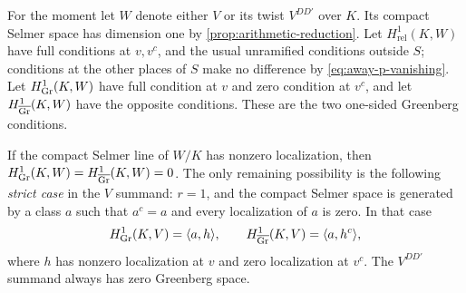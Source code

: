 For the moment let $W$ denote either $V$ or its twist $V^{DD'}$ over
$K$.  Its compact Selmer space has dimension one by
\cref{prop:arithmetic-reduction}.  Let $H^1_{\mathrm{rel}}(K,W)$ have full
conditions at $v,v^c$, and the usual unramified conditions outside
$S$; conditions at the other places of $S$ make no difference by
\cref{eq:away-p-vanishing}.  Let $H^1_{\operatorname{Gr}}(K,W)$ have full condition
at $v$ and zero condition at $v^c$, and let
$H^1_{\overline{\operatorname{Gr}}}(K,W)$ have the opposite conditions.
These are the two one-sided Greenberg conditions.

\begin{lemma}\label{lem:base-green}
If the compact Selmer line of $W/K$ has nonzero localization, then
$H^1_{\operatorname{Gr}}(K,W)=H^1_{\overline{\operatorname{Gr}}}(K,W)=0$.
The only remaining possibility is the following \emph{strict case}
in the $V$ summand: $r=1$, and the compact Selmer space is generated
by a class $a$ such that $a^c=a$ and every localization of $a$ is zero.
In that case
\begin{equation}\label{eq:base-green-bases}
 H^1_{\operatorname{Gr}}(K,V)=\langle a,h\rangle,
 \qquad
 H^1_{\overline{\operatorname{Gr}}}(K,V)=\langle a,h^c\rangle,
\end{equation}
where $h$ has nonzero localization at $v$ and zero localization at
$v^c$.  The $V^{DD'}$ summand always has zero Greenberg space.
\end{lemma}

